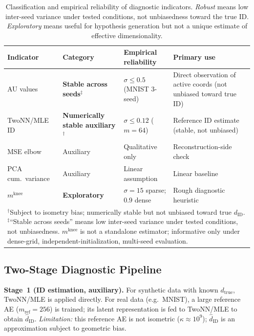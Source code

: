 \documentclass[make,article,submit,pdftex,moreauthors]{Definitions/mdpi}
\newcommand{\dID}{d_{\mathrm{ID}}}
\newcommand{\dtrue}{d_{\mathrm{true}}}
\newcommand{\kap}{\kappa}
\newcommand{\mknee}{m^{\mathrm{knee}}}
\newcommand{\hatdID}{\hat{d}_{\mathrm{ID}}}
\begin{document}
\begin{table}[ht]
\centering
\caption{Classification and empirical reliability of diagnostic indicators.
\emph{Robust} means low inter-seed variance under tested conditions, not unbiasedness toward the true ID.
\emph{Exploratory} means useful for hypothesis generation but not a unique estimate of effective dimensionality.}
\label{tab:indicator_class}
\small
\begin{tabularx}{\linewidth}{lXXX}
\toprule
Indicator & Category & Empirical reliability & Primary use \\
\midrule
AU values & \textbf{Stable across seeds}$^\ddagger$ & $\sigma\!\leq\!0.5$ (MNIST 3-seed) & Direct observation of active coords (not unbiased toward true ID) \\
TwoNN/MLE ID & \textbf{Numerically stable auxiliary}$^\dagger$ & $\sigma\!\leq\!0.12$ ($m\!=\!64$) & Reference ID estimate (stable, not unbiased) \\
MSE elbow & Auxiliary & Qualitative only & Reconstruction-side check \\
PCA cum.\ variance & Auxiliary & Linear assumption & Linear baseline \\
$\mknee$ & \textbf{Exploratory} & $\sigma\!=\!15$ sparse; $0.9$ dense & Rough diagnostic heuristic \\
\bottomrule
\multicolumn{4}{p{0.97\linewidth}}{\footnotesize
$^\dagger$Subject to isometry bias; numerically stable but not unbiased toward true $\dID$.
$^\ddagger$``Stable across seeds'' means low inter-seed variance under tested conditions, not unbiasedness.
$\mknee$ is not a standalone estimator; informative only under dense-grid,
independent-initialization, multi-seed evaluation.}
\end{tabularx}
\end{table}

\subsection{Two-Stage Diagnostic Pipeline}\label{sec:framework_pipeline}

\textbf{Stage~1 (ID estimation, auxiliary).}
For synthetic data with known $\dtrue$, TwoNN/MLE is applied directly.
For real data (e.g.\ MNIST), a large reference AE ($m_{\mathrm{ref}}=256$) is
trained; its latent representation is fed to TwoNN/MLE to obtain $\hatdID$.
\emph{Limitation:} this reference AE is not isometric ($\kap\approx10^9$);
$\hatdID$ is an approximation subject to geometric bias.
\end{document}
